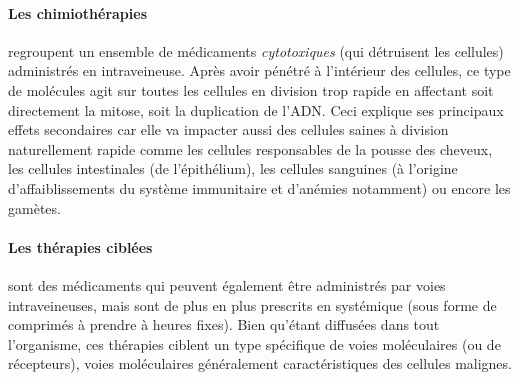 \documentclass[main.tex]{subfiles}
\begin{document}
\paragraph{Les chimiothérapies} regroupent un ensemble de médicaments \emph{cytotoxiques} (\ie qui détruisent les cellules) administrés en intraveineuse. 
Après avoir pénétré à l'intérieur des cellules, ce type de molécules agit 
sur toutes les cellules en division trop rapide en affectant soit directement la mitose, soit la duplication de l'ADN. 
Ceci explique ses principaux effets secondaires car elle va impacter aussi des cellules saines à division naturellement rapide comme les cellules responsables de la pousse des cheveux, les cellules intestinales (de l'épithélium), les cellules sanguines (à l'origine d'affaiblissements du système immunitaire et d'anémies notamment) ou encore les gamètes.

\paragraph{Les thérapies ciblées} sont des médicaments qui peuvent également être administrés par voies intraveineuses, mais sont de plus en plus prescrits en %
systémique 
(\ie sous forme de comprimés à prendre à heures fixes). Bien qu'étant diffusées dans tout l'organisme, ces thérapies ciblent un type spécifique de voies moléculaires (ou de récepteurs), voies moléculaires généralement caractéristiques des cellules malignes. 

\begin{figure}
\hfill
{}\hfill
{}
\caption{\label{fig:voies_moleculaires}}
\end{figure}
\end{document}
